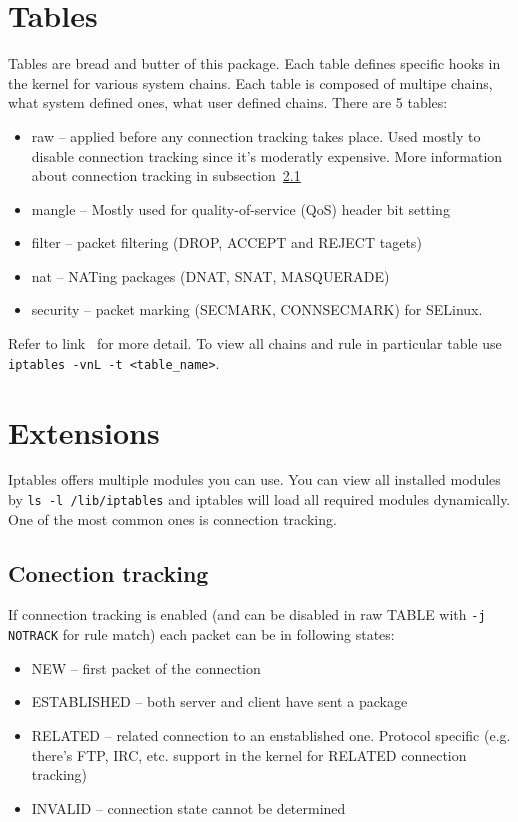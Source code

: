 \documentclass[times, utf8, seminar, english]{fer}
\begin{document}
\section{Tables}
    Tables are bread and butter of this package. Each table defines specific hooks in the kernel for various system chains. Each table is composed of multipe chains, what system defined ones, what user defined chains.
    There are 5 tables:
    \begin{itemize}
        \item raw -- applied before any connection tracking takes place. Used mostly to disable connection tracking since it's moderatly expensive. More information about connection tracking in subsection~\ref{subsec:conn-track}
        \item mangle -- Mostly used for quality-of-service (QoS) header bit setting
        \item filter -- packet filtering (DROP, ACCEPT and REJECT tagets)
        \item nat -- NATing packages (DNAT, SNAT, MASQUERADE)
        \item security -- packet marking (SECMARK, CONNSECMARK) for SELinux.
    \end{itemize}
    Refer to link~\cite{Iptables27:online} for more detail. To view all chains and rule in particular table use \verb|iptables -vnL -t <table_name>|.

\section{Extensions}
    Iptables offers multiple modules you can use.
    You can view all installed modules by \texttt{ls -l /lib/iptables} and iptables will load all required modules dynamically. One of the most common ones is connection tracking.

    \subsection{Conection tracking}
    \label{subsec:conn-track}
    If connection tracking is enabled (and can be disabled in raw TABLE with \texttt{-j NOTRACK} for rule match) each packet can be in following states:
    \begin{itemize}
        \item NEW -- first packet of the connection
        \item ESTABLISHED -- both server and client have sent a package
        \item RELATED -- related connection to an enstablished one. Protocol specific (e.g. there's FTP, IRC, etc. support in the kernel for RELATED connection tracking)
        \item INVALID -- connection state cannot be determined
    \end{itemize}
\end{document}

